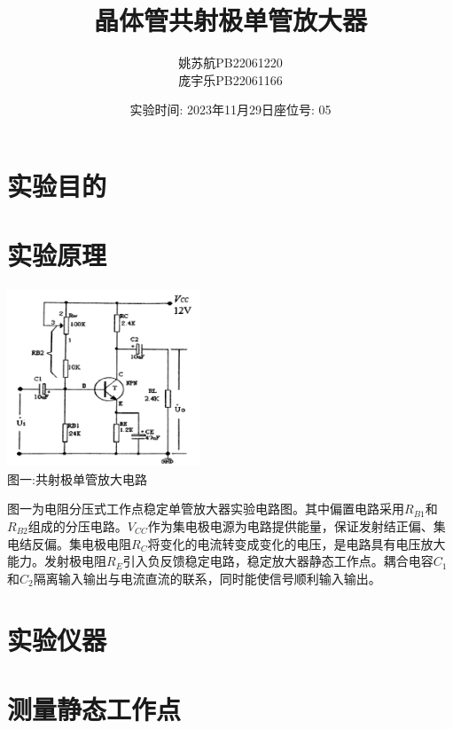 \documentclass[a4paper]{article}
\title{\textbf{晶体管共射极单管放大器}}
\author{姚苏航\qquad PB22061220 \\ 庞宇乐\qquad PB22061166}
\date{实验时间: 2023年11月29日\qquad 座位号: 05}
\begin{document}
    \maketitle


    \section{实验目的\cite{ed4}}\label{sec:}





    \section{实验原理}\label{sec:10}
    \begin{center}
        \includegraphics[height=150pt]{AC}\\
        {\small 图一:共射极单管放大电路}
    \end{center}

    {{图一为电阻分压式工作点稳定单管放大器实验电路图。其中偏置电路采用$R_{B1}$和$R_{B2}$组成的分压电路。$V_{CC}$作为集电极电源为电路提供能量，保证发射结正偏、集电结反偏。集电极电阻$R_C$将变化的电流转变成变化的电压，是电路具有电压放大能力。发射极电阻$R_E$引入负反馈稳定电路，稳定放大器静态工作点。耦合电容$C_1$和$C_2$隔离输入输出与电流直流的联系，同时能使信号顺利输入输出。}}


    \section{实验仪器}\label{sec:2}


    \section{测量静态工作点}\label{sec:3}
\end{document}
